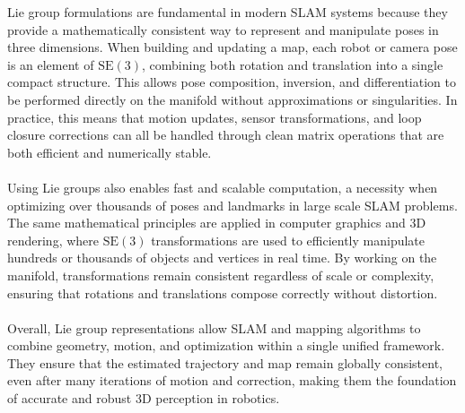\noindent
Lie group formulations are fundamental in modern SLAM systems because they provide a mathematically consistent way to represent and manipulate poses in three dimensions. When building and updating a map, each robot or camera pose is an element of $\mathrm{SE}(3)$, combining both rotation and translation into a single compact structure. This allows pose composition, inversion, and differentiation to be performed directly on the manifold without approximations or singularities. In practice, this means that motion updates, sensor transformations, and loop closure corrections can all be handled through clean matrix operations that are both efficient and numerically stable.  
\\ \\
Using Lie groups also enables fast and scalable computation, a necessity when optimizing over thousands of poses and landmarks in large scale SLAM problems. The same mathematical principles are applied in computer graphics and 3D rendering, where $\mathrm{SE}(3)$ transformations are used to efficiently manipulate hundreds or thousands of objects and vertices in real time. By working on the manifold, transformations remain consistent regardless of scale or complexity, ensuring that rotations and translations compose correctly without distortion.  
\\ \\
Overall, Lie group representations allow SLAM and mapping algorithms to combine geometry, motion, and optimization within a single unified framework. They ensure that the estimated trajectory and map remain globally consistent, even after many iterations of motion and correction, making them the foundation of accurate and robust 3D perception in robotics.



\newpage



